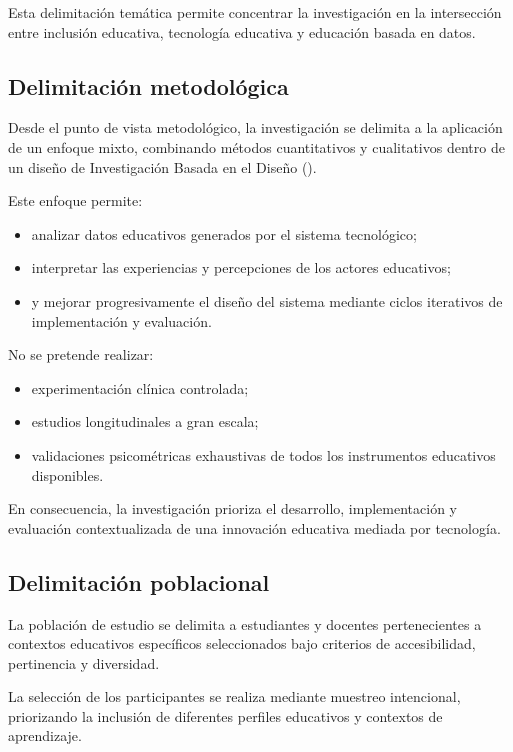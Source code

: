 \begin{refsection}
Esta delimitación temática permite concentrar la investigación en la intersección entre inclusión educativa, tecnología educativa y educación basada en datos.

\subsection{Delimitación metodológica}

Desde el punto de vista metodológico, la investigación se delimita a la aplicación de un enfoque mixto, combinando métodos cuantitativos y cualitativos dentro de un diseño de Investigación Basada en el Diseño (\DBR).

Este enfoque permite:

\begin{itemize}
\item analizar datos educativos generados por el sistema tecnológico;
\item interpretar las experiencias y percepciones de los actores educativos;
\item y mejorar progresivamente el diseño del sistema mediante ciclos iterativos de implementación y evaluación.
\end{itemize}

No se pretende realizar:

\begin{itemize}
\item experimentación clínica controlada;
\item estudios longitudinales a gran escala;
\item validaciones psicométricas exhaustivas de todos los instrumentos educativos disponibles.
\end{itemize}

En consecuencia, la investigación prioriza el desarrollo, implementación y evaluación contextualizada de una innovación educativa mediada por tecnología.

\subsection{Delimitación poblacional}

La población de estudio se delimita a estudiantes y docentes pertenecientes a contextos educativos específicos seleccionados bajo criterios de accesibilidad, pertinencia y diversidad.

La selección de los participantes se realiza mediante muestreo intencional, priorizando la inclusión de diferentes perfiles educativos y contextos de aprendizaje.


\end{refsection}
